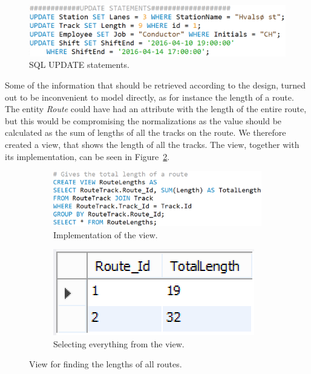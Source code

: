 \begin{figure}[ht!]
    \centering
    \includegraphics[scale=.5]{img/UPDATE_Statements}
    \caption{SQL UPDATE statements.}
    \label{fig:update}
\end{figure}

Some of the information that should be retrieved according to the design, 
turned out to be inconvenient to model directly, as for instance the length 
of a route. The entity \emph{Route} could have had an attribute with the length 
of the entire route, but this would be compromising the normalizations as the 
value should be calculated as the sum of lengths of all the tracks on the 
route. We therefore created a view, that shows the length of all the 
tracks. The view, together with its implementation, can be seen in 
Figure~\ref{fig:length}.

\begin{figure}[h]
    \centering
    \begin{subfigure}[b]{0.45 \textwidth}
        \centering
        \includegraphics[width=\textwidth]{img/RouteLengths}
        \caption{Implementation of the view.}
    \end{subfigure}
    \begin{subfigure}[b]{0.45 \textwidth}
        \centering
        \includegraphics{img/RouteLengthsView}
        \caption{Selecting everything from the view.}
    \end{subfigure}
    \caption{View for finding the lengths of all routes.}
    \label{fig:length}
\end{figure}

